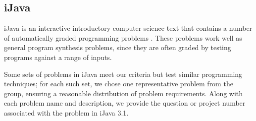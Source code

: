 \documentclass{sig-alternate}
\begin{document}
\subsection{iJava}


iJava is an interactive introductory computer science text that contains a number of automatically graded programming problems \cite{iJava}. %
 These problems work well as general program synthesis problems, since they are often graded by testing programs against a range of inputs.

Some sets of problems in iJava meet our criteria but test similar programming techniques; for each such set, we chose one representative problem from the group, ensuring a reasonable distribution of problem requirements. Along with each problem name and description, we provide the question or project number associated with the problem in iJava 3.1.
\end{document}

